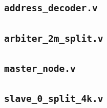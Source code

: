 \documentclass[11pt,a4paper]{article}
\newcommand{\sig}[1]{\texttt{#1}}
\begin{document}
\subsection{\sig{address\_decoder.v}}


\subsection{\sig{arbiter\_2m\_split.v}}


\subsection{\sig{master\_node.v}}


\subsection{\sig{slave\_0\_split\_4k.v}}

\end{document}
